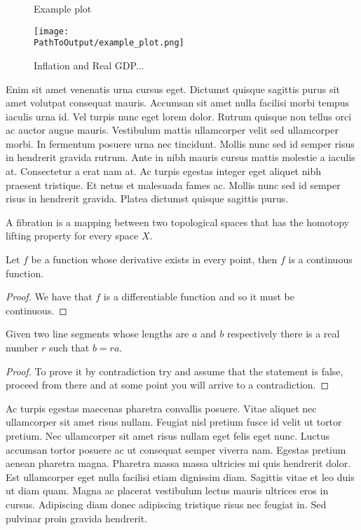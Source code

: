 \documentclass[12pt]{article}
\begin{document}
\begin{figure}
\centering
\caption{Example plot}
  \centering
  \texttt{[image: \\PathToOutput/example\_plot.png]}
\caption*{
  Inflation and Real GDP...
  }
\label{fig:div-futures-habits-comparison}
\end{figure}

Enim sit amet venenatis urna cursus eget. Dictumst quisque sagittis purus sit
amet volutpat consequat mauris. Accumsan sit amet nulla facilisi morbi tempus
iaculis urna id. Vel turpis nunc eget lorem dolor. Rutrum quisque non tellus
orci ac auctor augue mauris. Vestibulum mattis ullamcorper velit sed
ullamcorper morbi. In fermentum posuere urna nec tincidunt. Mollis nunc sed
id semper risus in hendrerit gravida rutrum. Ante in nibh mauris cursus
mattis molestie a iaculis at. Consectetur a erat nam at. Ac turpis egestas
integer eget aliquet nibh praesent tristique. Et netus et malesuada fames ac.
Mollis nunc sed id semper risus in hendrerit gravida. Platea dictumst quisque
sagittis purus.

\begin{mydefinition}[Fibration]
  A fibration is a mapping between two topological spaces that has the homotopy lifting property for every space \(X\).
\end{mydefinition}

\begin{proposition}
  Let \(f\) be a function whose derivative exists in every point, then \(f\) is 
  a continuous function.
\end{proposition}
\begin{proof}
  We have that \(f\) is a differentiable function and so it must be continuous.
\end{proof}

\begin{mylemma}
  Given two line segments whose lengths are \(a\) and \(b\) respectively there is a 
  real number \(r\) such that \(b=ra\).
\end{mylemma}

\begin{proof}
  To prove it by contradiction try and assume that the statement is false,
  proceed from there and at some point you will arrive to a contradiction.
\end{proof}

Ac turpis egestas maecenas pharetra convallis posuere. Vitae aliquet nec
ullamcorper sit amet risus nullam. Feugiat nisl pretium fusce id velit ut
tortor pretium. Nec ullamcorper sit amet risus nullam eget felis eget nunc.
Luctus accumsan tortor posuere ac ut consequat semper viverra nam. Egestas
pretium aenean pharetra magna. Pharetra massa massa ultricies mi quis
hendrerit dolor. Est ullamcorper eget nulla facilisi etiam dignissim diam.
Sagittis vitae et leo duis ut diam quam. Magna ac placerat vestibulum lectus
mauris ultrices eros in cursus. Adipiscing diam donec adipiscing tristique
risus nec feugiat in. Sed pulvinar proin gravida hendrerit.
\end{document}
